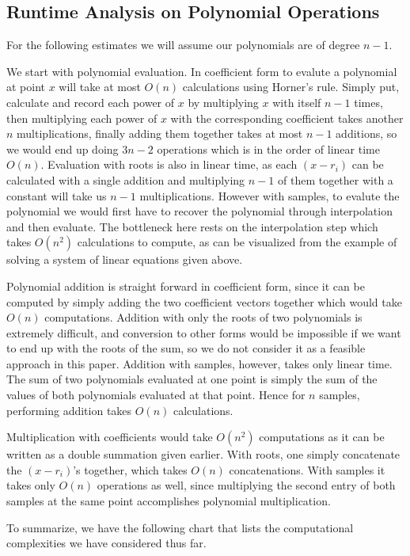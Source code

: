 \documentclass[12pt]{article}
\begin{document}
\subsection{Runtime Analysis on Polynomial Operations}

For the following estimates we will assume our polynomials are of degree $n-1$.

We start with polynomial evaluation. In coefficient form to evalute a polynomial at point $x$ will take at most $O(n)$ calculations using Horner's rule. Simply put, calculate and record each power of $x$ by multiplying $x$ with itself $n-1$ times, then multiplying each power of $x$ with the corresponding coefficient takes another $n$ multiplications, finally adding them together takes at most $n-1$ additions, so we would end up doing $3n-2$ operations which is in the order of linear time $O(n)$. Evaluation with roots is also in linear time, as each $(x-r_i)$ can be calculated with a single addition and multiplying $n-1$ of them together with a constant will take us $n-1$ multiplications. However with samples, to evalute the polynomial we would first have to recover the polynomial through interpolation and then evaluate. The bottleneck here rests on the interpolation step which takes $O(n^2)$ calculations to compute, as can be visualized from the example of solving a system of linear equations given above.

Polynomial addition is straight forward in coefficient form, since it can be computed by simply adding the two coefficient vectors together which would take $O(n)$ computations. Addition with only the roots of two polynomials is extremely difficult, and conversion to other forms would be impossible if we want to end up with the roots of the sum, so we do not consider it as a feasible approach in this paper. Addition with samples, however, takes only linear time. The sum of two polynomials evaluated at one point is simply the sum of the values of both polynomials evaluated at that point. Hence for $n$ samples, performing addition takes $O(n)$ calculations.

Multiplication with coefficients would take $O(n^2)$ computations as it can be written as a double summation given earlier. With roots, one simply concatenate the $(x-r_i)$'s together, which takes $O(n)$ concatenations. With samples it takes only $O(n)$ operations as well, since multiplying the second entry of both samples at the same point accomplishes polynomial multiplication.

To summarize, we have the following chart that lists the computational complexities we have considered thus far.
\end{document}
